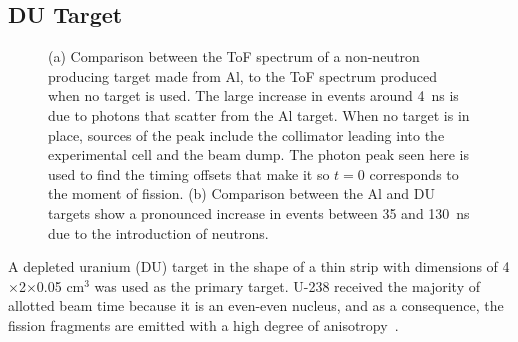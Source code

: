 \documentclass[%
 reprint,
 amsmath,amssymb,
 aps,
 nofootinbib
]{revtex4-1}
\begin{document}
\subsection{DU Target}
\label{subsection:targets}
\begin{figure}[]
\centering
    
    \caption{(a) Comparison between the ToF spectrum of a non-neutron producing target made from Al, to the ToF spectrum produced when no target is used.
    The large increase in events around 4~ns is due to photons that scatter from the Al target.
    When no target is in place, sources of the peak include the collimator leading into the experimental cell and the beam dump.
    The photon peak seen here is used to find the timing offsets that make it so $t=0$ corresponds to the moment of fission.
    (b) Comparison between the Al and DU targets show a pronounced increase in events between 35 and 130~ns due to the introduction of neutrons.}
    \label{fig:ToF}
\end{figure}
A depleted uranium (DU) target in the shape of a thin strip with dimensions of 4$\times$2$\times$0.05 $\text{cm}^3$ was used as the primary target.
U-238 received the majority of allotted beam time because it is an even-even nucleus, and as a consequence, the fission fragments are emitted with a high degree of anisotropy~\cite{1977FragAss}.
\end{document}
